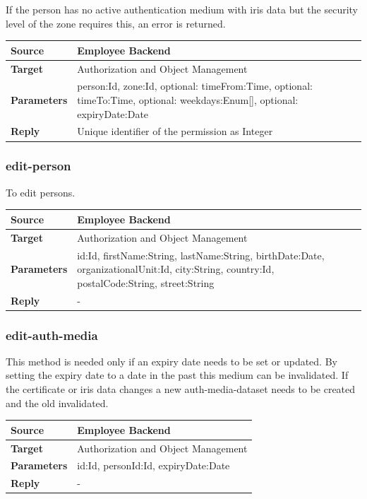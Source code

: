 \documentclass[12pt,a4paper,titlepage,oneside]{scrartcl}
\begin{document}
If the person has no active authentication medium with iris data but the security level of the zone requires this, an error is returned.

\begin{table}[h]
    \centering
    \begin{tabular}{|l|p{12cm}|} \hline
    \textbf{Source}&Employee Backend\\ \hline
    \textbf{Target}&Authorization and Object Management\\ \hline
    \textbf{Parameters}&person:Id, zone:Id, optional: timeFrom:Time, optional: timeTo:Time, optional: weekdays:Enum[], optional: expiryDate:Date\\ \hline
    \textbf{Reply}&Unique identifier of the permission as Integer\\ \hline
    \end{tabular}
\end{table}

\subsubsection{edit-person}
To edit persons.

\begin{table}[h]
    \centering
    \begin{tabular}{|l|p{12cm}|} \hline
    \textbf{Source}&Employee Backend\\ \hline
    \textbf{Target}&Authorization and Object Management\\ \hline
    \textbf{Parameters}&id:Id, firstName:String, lastName:String, birthDate:Date, organizationalUnit:Id, city:String, country:Id, postalCode:String, street:String\\ \hline
    \textbf{Reply}&-\\ \hline
    \end{tabular}
\end{table}


\subsubsection{edit-auth-media}
This method is needed only if an expiry date needs to be set or updated. By setting the expiry date to a date in the past this medium can be invalidated. If the certificate or iris data changes a new auth-media-dataset needs to be created and the old invalidated.

\begin{table}[h]
    \centering
    \begin{tabular}{|l|p{12cm}|} \hline
    \textbf{Source}&Employee Backend\\ \hline
    \textbf{Target}&Authorization and Object Management\\ \hline
    \textbf{Parameters}&id:Id, personId:Id, expiryDate:Date\\ \hline
    \textbf{Reply}&-\\ \hline
    \end{tabular}
\end{table}
\end{document}
